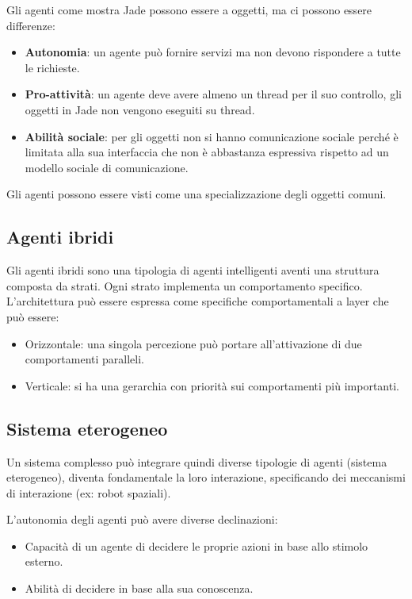 Gli agenti come mostra Jade possono essere a oggetti, ma ci possono essere differenze:
\begin{itemize}
    \item \textbf{Autonomia}: un agente può fornire servizi ma non devono
          rispondere a tutte le richieste.
    \item \textbf{Pro-attività}: un agente deve avere almeno un thread per il
          suo controllo, gli oggetti in Jade non vengono eseguiti su thread.
    \item \textbf{Abilità sociale}: per gli oggetti non si hanno comunicazione
          sociale perché è limitata alla sua interfaccia che non è abbastanza
          espressiva rispetto ad un modello sociale di comunicazione.
\end{itemize}
Gli agenti possono essere visti come una specializzazione degli oggetti comuni.
\subsection{Agenti ibridi}
Gli agenti ibridi sono una tipologia di agenti intelligenti aventi una struttura
composta da strati. Ogni strato implementa un comportamento specifico.
L'architettura può essere espressa come specifiche comportamentali a layer che
può essere:
\begin{itemize}
    \item Orizzontale: una singola percezione può portare all'attivazione di due
          comportamenti paralleli.
    \item Verticale: si ha una gerarchia con priorità sui comportamenti più
          importanti.
\end{itemize}
\subsection{Sistema eterogeneo}
Un sistema complesso può integrare quindi diverse tipologie di agenti
(sistema eterogeneo), diventa fondamentale la loro interazione, specificando dei
meccanismi di interazione (ex: robot spaziali).

L'autonomia degli agenti può avere diverse declinazioni:
\begin{itemize}
    \item Capacità di un agente di decidere le proprie azioni in base allo stimolo
          esterno.
    \item Abilità di decidere in base alla sua conoscenza.
\end{itemize}
